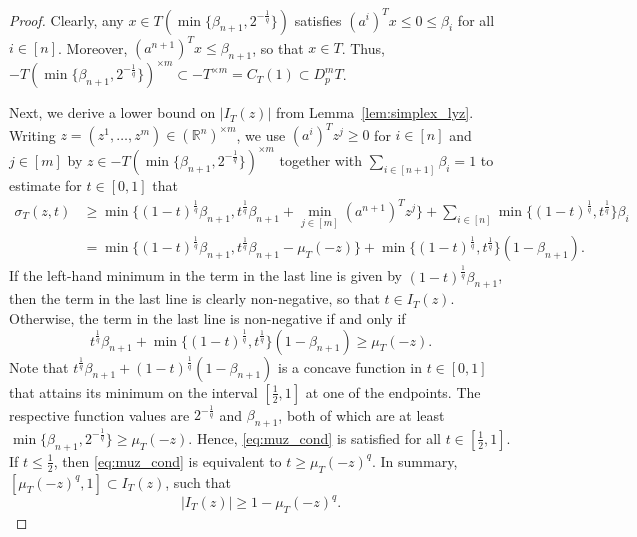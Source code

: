 \documentclass{amsart}
\newcommand\R{\mathbb{R}}
\newcommand{\diff}[3]{D_{#1}^{#2} #3}
\newcommand{\lyz}[4]{C_{#3} (#4)}
\newcommand{\interval}[4]{I_{#3} (#4)}
\newcommand{\sumfunc}[5]{\sigma_{#3}(#4,#5)}
\newcommand{\simplexscale}[2]{#1(#2)}
\newcommand{\simplexscaling}[2]{\mu_{#1}(#2)}
\newcommand{\cartesian}[2]{#1^{\times #2}}
\begin{document}
\begin{proof}
Clearly, any $x \in \simplexscale{T}{\min \{ \beta_{n+1}, 2^{-\frac{1}{q}} \}}$ satisfies $(a^i)^T x \leq 0 \leq \beta_i$ for all $i \in [n]$.
Moreover, $(a^{n+1})^T x \leq \beta_{n+1}$,
so that $x \in T$.
Thus, $-\cartesian{\simplexscale{T}{\min \{ \beta_{n+1}, 2^{-\frac{1}{q}} \}}}{m} \subset -\cartesian{T}{m} = \lyz{p}{m}{T}{1} \subset \diff{p}{m}{T}$.

Next, we derive a lower bound on $|\interval{p}{m}{T}{z}|$ from  Lemma~\ref{lem:simplex_lyz}.
Writing $z = (z^1, \dots, z^m) \in \cartesian{(\R^n)}{m}$, we use $(a^i)^T z^j \geq 0$ for $i \in [n]$ and $j \in [m]$ by $z \in -\cartesian{\simplexscale{T}{\min\{ \beta_{n+1}, 2^{-\frac{1}{q}} \}}}{m}$ together with $\sum_{i \in [n+1]} \beta_i = 1$ to estimate for $t \in [0,1]$ that
\begin{align*}
	\sumfunc{p}{m}{T}{z}{t}
	& \geq  \min \bigg\{ (1-t)^{\frac{1}{q}} \beta_{n+1}, t^{\frac{1}{q}} \beta_{n+1} + \min_{j \in [m]} (a^{n+1})^T z^j \bigg\}
		+ \sum_{i \in [n]} \min \Big\{ (1-t)^{\frac{1}{q}}, t^{\frac{1}{q}} \Big\} \beta_i
	\\
	& = \min \bigg\{ (1-t)^{\frac{1}{q}} \beta_{n+1}, t^{\frac{1}{q}} \beta_{n+1} - \simplexscaling{T}{-z} \bigg\}
		+ \min \Big\{ (1-t)^{\frac{1}{q}}, t^{\frac{1}{q}} \Big\} (1 - \beta_{n+1}).
\end{align*}
If the left-hand minimum in the term in the last line is given by $(1-t)^{\frac{1}{q}} \beta_{n+1}$,
then the term in the last line is clearly non-negative, so that $t \in \interval{p}{m}{T}{z}$.
Otherwise, the term in the last line is non-negative if and only if
\begin{equation}\label{eq:muz_cond}
	t^{\frac{1}{q}} \beta_{n+1} + \min \Big\{ (1-t)^{\frac{1}{q}}, t^{\frac{1}{q}} \Big\} (1 - \beta_{n+1})
	\geq \simplexscaling{T}{-z}.
\end{equation}
Note that $t^{\frac{1}{q}} \beta_{n+1} + (1-t)^{\frac{1}{q}} (1-\beta_{n+1})$ is a concave function in $t \in [0,1]$
that attains its minimum on the interval $[\frac{1}{2},1]$ at one of the endpoints.
The respective function values are $2^{-\frac{1}{q}}$ and $\beta_{n+1}$,
both of which are at least $\min\{ \beta_{n+1}, 2^{-\frac{1}{q}} \} \geq \simplexscaling{T}{-z}$.
Hence, \eqref{eq:muz_cond} is satisfied for all $t \in [\frac{1}{2},1]$.
If $t \leq \frac{1}{2}$, then \eqref{eq:muz_cond} is equivalent to $t \geq \simplexscaling{T}{-z}^q$.
In summary, $[\simplexscaling{T}{-z}^q,1] \subset \interval{p}{m}{T}{z}$, such that
\begin{equation}\label{eq:iz_muz_bound}
	|\interval{p}{m}{T}{z}|
	\geq 1 - \simplexscaling{T}{-z}^q.
\end{equation}


\end{proof}
\end{document}

